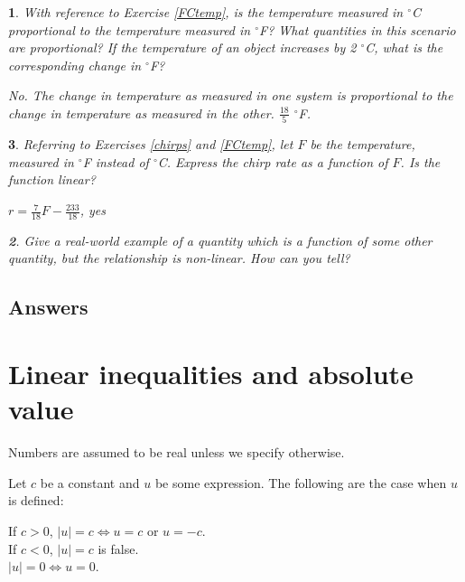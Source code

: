 \documentclass{amsbook}
\newtheorem{exc}{}
\newenvironment{ex}{\begin{exc}\normalfont}{\end{exc}}
\numberwithin{section}{chapter}
\numberwithin{equation}{chapter}
\begin{document}
\begin{ex}
	With reference to Exercise \ref{FCtemp}, is the temperature measured in $^\circ$C proportional to the temperature measured in $^\circ$F? What quantities in this scenario are proportional? If the temperature of an object increases by 2 $^\circ$C, what is the corresponding change in $^\circ$F?
	\begin{sol}
		No. The change in temperature as measured in one system is proportional to the change in temperature as measured in the other. $\frac{18}{5}$ $^\circ$F.
	\end{sol}
\end{ex}

\begin{ex}\label{FComp}
	Referring to Exercises \ref{chirps} and \ref{FCtemp}, let $F$ be the temperature, measured in $^\circ$F instead of $^\circ$C. Express the chirp rate as a function of $F$. Is the function linear?
	\begin{sol}
		$r = \frac{7}{18}F-\frac{233}{18}$, yes
	\end{sol}

\begin{ex}
	Give a real-world example of a quantity which is a function of some other quantity, but the relationship is non-linear. How can you tell?
\end{ex}
	
\end{ex}

\subsection*{Answers\nopunct} \hfill
\begin{multicols}{2}
	
\end{multicols}


\newpage
\section{Linear inequalities and absolute value} 

Numbers are assumed to be real unless we specify otherwise.

Let $c$ be a constant and $u$ be some expression. The following are the case when $u$ is defined:

If $c > 0$, $|u| = c \iff u=c$ or $u=-c$.\\
If $c < 0$, $|u| = c$ is false.\\
$|u|=0 \iff u=0$.
\end{document}
